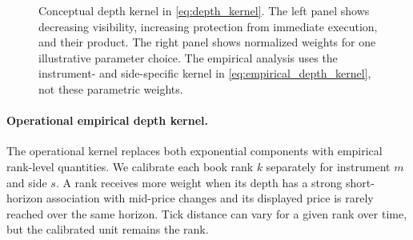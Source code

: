\documentclass[11pt]{article}
\begin{document}
\begin{figure}[htbp]
{%
    }
    \caption{Conceptual depth kernel in \cref{eq:depth_kernel}. The left panel shows decreasing visibility, increasing
    protection from immediate execution, and their product. The right panel shows normalized weights for one illustrative
    parameter choice. The empirical analysis uses the instrument- and side-specific kernel in
    \cref{eq:empirical_depth_kernel}, not these parametric weights.}
    \label{fig:depth_kernel_behavior}
\end{figure}

\paragraph{Operational empirical depth kernel.}
The operational kernel replaces both exponential components with empirical rank-level quantities. We calibrate each book
rank $k$ separately for instrument $m$ and side $s$. A rank receives more weight when its depth has a strong short-horizon
association with mid-price changes and its displayed price is rarely reached over the same horizon. Tick distance can vary
for a given rank over time, but the calibrated unit remains the rank.
\end{document}
